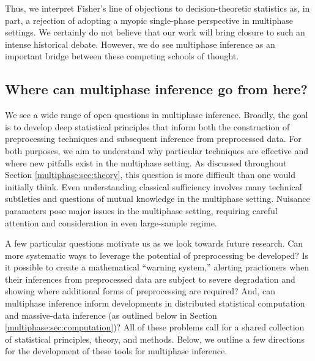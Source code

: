 Thus, we interpret Fisher's line of objections to decision-theoretic statistics as, in part, a rejection of adopting a myopic single-phase perspective in multiphase settings.
We certainly do not believe that our work will bring closure to such an intense historical debate.
However, we do see multiphase inference as an important bridge between these competing schools of thought.

\subsection{Where can multiphase inference go from here?}
\label{multiphase:sec:future}

We see a wide range of open questions in multiphase inference.
Broadly, the goal is to develop deep statistical principles that inform both the construction of preprocessing techniques and subsequent inference from preprocessed data.
For both purposes, we aim to understand why particular techniques are effective and where new pitfalls exist in the multiphase setting.
As discussed throughout Section \ref{multiphase:sec:theory}, this question is more difficult than one would initially think.
Even understanding classical sufficiency involves many technical subtleties and questions of mutual knowledge in the multiphase setting.
Nuisance parameters pose major issues in the multiphase setting, requiring careful attention and consideration in even large-sample regime.

A few particular questions motivate us as we look towards future research.
Can more systematic ways to leverage the potential of preprocessing be developed?
Is it possible to create a  mathematical ``warning system,'' alerting practioners when their inferences from preprocessed data are subject to severe degradation and showing where additional forms of preprocessing are required?
And, can multiphase inference inform developments in distributed statistical computation and massive-data inference (as outlined below in Section \ref{multiphase:sec:computation})?
All of these problems call for a shared collection of statistical principles, theory, and methods.
Below, we outline a few directions for the development of these tools for multiphase inference.

